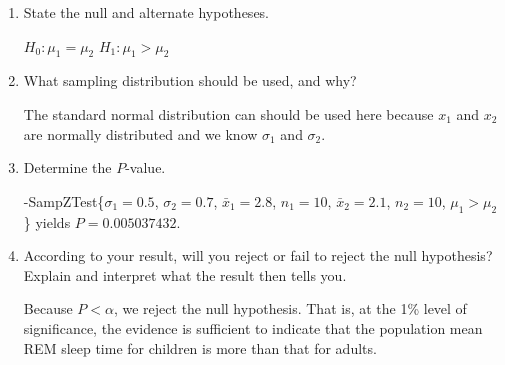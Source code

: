 \begin{enumerate}
	\begin{enumerate}
	\item State the null and alternate hypotheses.  
	
	{\answer $H_0: \mu_1 = \mu_2$  
	$H_1: \mu_1 > \mu_2$}
	 

	\item What sampling distribution should be used, and why?  
	
	{\answer The standard normal distribution can should be used here because $x_1$ and $x_2$ are normally distributed and we know $\sigma_1$ and $\sigma_2$.}
	 

	\item Determine the $P$-value.  

	{-SampZTest\{$\sigma_1 = 0.5$, $\sigma_2 = 0.7$, $\bar{x}_1 = 2.8$, $n_1 = 10$, $\bar{x}_2 = 2.1$, $n_2 = 10$, $\mu_1 > \mu_2$\} yields $P = 0.005037432 $.}
	 

	\item  According to your result, will you reject or fail to reject the null hypothesis?  Explain and interpret what the result then tells you.  
	
	{\answer Because $P < \alpha$, we reject the null hypothesis.  That is, at the 1\% level of significance, the evidence is sufficient to indicate that the population mean REM sleep time for children is more than that for adults.}
	 

	\end{enumerate}

\end{enumerate}
